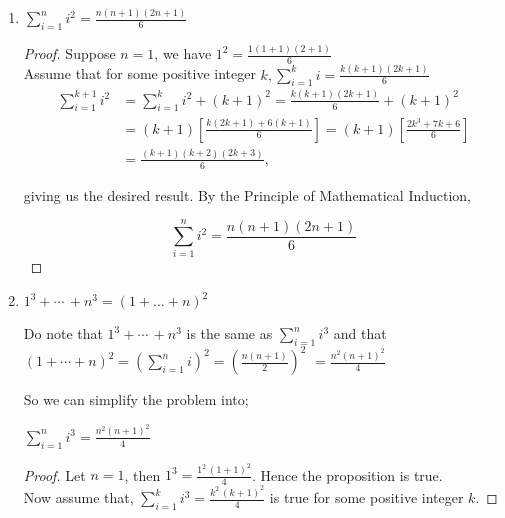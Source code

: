 \documentclass[11pt]{amsart}
\begin{document}
\begin{enumerate}[label=\Alph*)]

	\begin{enumerate}[label=\roman)*]
		\item $\sum_{i=1}^{n} i^2 = \frac{n(n+1)(2n+1)}{6}$

		\begin{proof}
			Suppose $n=1$, we have $1^2 = \frac{1(1+1)(2+1)}{6}$ \\

			Assume that for some positive integer $k, \sum_{i=1}^{k} i = \frac{k(k+1)(2k+1)}{6}$ \\

			\begin{align*}
				\sum_{i=1}^{k+1} i^2 &= \sum_{i=1}^{k} i^2 + (k+1)^2 = \frac{k(k+1)(2k+1)}{6} + (k+1)^2 \\
				&= (k+1)\left[\frac{k(2k+1)+6(k+1)}{6}\right] = (k+1)\left[\frac{2k^3 +7k + 6}{6}\right] \\
				&= \frac{(k+1)(k+2)(2k+3)}{6},
			\end{align*}

			giving us the desired result. By the Principle of Mathematical Induction,

			\[
				\sum_{i=1}^{n} i^2 = \frac{n(n+1)(2n+1)}{6}
			\]
		\end{proof}

		\item $1^3 + \cdots \, + n^3 = \left(1 + \dots + n\right)^2$

		\bigskip

		Do note that $1^3 + \cdots \, + n^3$ is the same as $\sum_{i=1}^n i^3$ and that\\

		$\left(1 + \cdots + n\right)^2 = \left(\sum_{i=1}^n i\right)^2 = \left(\frac{n(n+1)}{2}\right)^2$
		$= \frac{n^2(n+1)^2}{4}$ \\

		\medskip

		So we can simplify the problem into;

		\medskip

		$\sum_{i=1}^n i^3 = \frac{n^2(n+1)^2}{4}$ \\

		\begin{proof}
			Let $n=1$, then $1^3 = \frac{1^2 \, (1+1)^2}{4}$. Hence the proposition is true.\\

			Now assume that, $\sum_{i=1}^{k} i^3 = \frac{k^2\,(k+1)^2}{4}$ is true for some positive integer $k$.


\end{proof}
\end{enumerate}
\end{enumerate}
\end{document}
